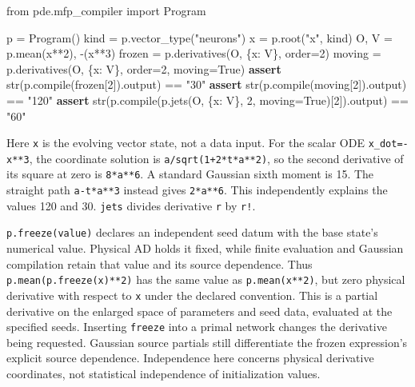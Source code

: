 \documentclass[
  11pt,
]{article}
\newenvironment{Shaded}{\begin{snugshade}}{\end{snugshade}}
\newcommand{\BuiltInTok}[1]{\textcolor[rgb]{0.00,0.23,0.31}{#1}}
\newcommand{\ControlFlowTok}[1]{\textcolor[rgb]{0.00,0.23,0.31}{\textbf{#1}}}
\newcommand{\DecValTok}[1]{\textcolor[rgb]{0.68,0.00,0.00}{#1}}
\newcommand{\ImportTok}[1]{\textcolor[rgb]{0.00,0.46,0.62}{#1}}
\newcommand{\NormalTok}[1]{\textcolor[rgb]{0.00,0.23,0.31}{#1}}
\newcommand{\OperatorTok}[1]{\textcolor[rgb]{0.37,0.37,0.37}{#1}}
\newcommand{\StringTok}[1]{\textcolor[rgb]{0.13,0.47,0.30}{#1}}
\newcommand{\VariableTok}[1]{\textcolor[rgb]{0.07,0.07,0.07}{#1}}
\theoremstyle{definition}
\theoremstyle{plain}
\theoremstyle{plain}
\theoremstyle{plain}
\theoremstyle{remark}
\begin{document}
\begin{Shaded}
\begin{Highlighting}[]
\ImportTok{from}\NormalTok{ pde.mfp\_compiler }\ImportTok{import}\NormalTok{ Program}

\NormalTok{p }\OperatorTok{=}\NormalTok{ Program()}
\NormalTok{kind }\OperatorTok{=}\NormalTok{ p.vector\_type(}\StringTok{"neurons"}\NormalTok{)}
\NormalTok{x }\OperatorTok{=}\NormalTok{ p.root(}\StringTok{"x"}\NormalTok{, kind)}
\NormalTok{O, V }\OperatorTok{=}\NormalTok{ p.mean(x}\OperatorTok{**}\DecValTok{2}\NormalTok{), }\OperatorTok{{-}}\NormalTok{(x}\OperatorTok{**}\DecValTok{3}\NormalTok{)}
\NormalTok{frozen }\OperatorTok{=}\NormalTok{ p.derivatives(O, \{x: V\}, order}\OperatorTok{=}\DecValTok{2}\NormalTok{)}
\NormalTok{moving }\OperatorTok{=}\NormalTok{ p.derivatives(O, \{x: V\}, order}\OperatorTok{=}\DecValTok{2}\NormalTok{, moving}\OperatorTok{=}\VariableTok{True}\NormalTok{)}
\ControlFlowTok{assert} \BuiltInTok{str}\NormalTok{(p.}\BuiltInTok{compile}\NormalTok{(frozen[}\DecValTok{2}\NormalTok{]).output) }\OperatorTok{==} \StringTok{"30"}
\ControlFlowTok{assert} \BuiltInTok{str}\NormalTok{(p.}\BuiltInTok{compile}\NormalTok{(moving[}\DecValTok{2}\NormalTok{]).output) }\OperatorTok{==} \StringTok{"120"}
\ControlFlowTok{assert} \BuiltInTok{str}\NormalTok{(p.}\BuiltInTok{compile}\NormalTok{(p.jets(O, \{x: V\}, }\DecValTok{2}\NormalTok{, moving}\OperatorTok{=}\VariableTok{True}\NormalTok{)[}\DecValTok{2}\NormalTok{]).output) }\OperatorTok{==} \StringTok{"60"}
\end{Highlighting}
\end{Shaded}

Here \texttt{x} is the evolving vector state, not a data input. For the
scalar ODE \texttt{x\_dot=-x**3}, the coordinate solution is
\texttt{a/sqrt(1+2*t*a**2)}, so the second derivative of its square at
zero is \texttt{8*a**6}. A standard Gaussian sixth moment is 15. The
straight path \texttt{a-t*a**3} instead gives \texttt{2*a**6}. This
independently explains the values 120 and 30. \texttt{jets} divides
derivative \texttt{r} by \texttt{r!}.

\texttt{p.freeze(value)} declares an independent seed datum with the
base state's numerical value. Physical AD holds it fixed, while finite
evaluation and Gaussian compilation retain that value and its source
dependence. Thus \texttt{p.mean(p.freeze(x)**2)} has the same value as
\texttt{p.mean(x**2)}, but zero physical derivative with respect to
\texttt{x} under the declared convention. This is a partial derivative
on the enlarged space of parameters and seed data, evaluated at the
specified seeds. Inserting \texttt{freeze} into a primal network changes
the derivative being requested. Gaussian source partials still
differentiate the frozen expression's explicit source dependence.
Independence here concerns physical derivative coordinates, not
statistical independence of initialization values.
\end{document}
